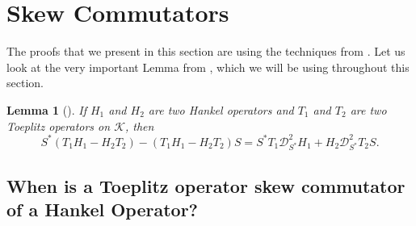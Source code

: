 \documentclass[12pt, reqno]{amsart}
\newtheorem{lemma}[theorem]{Lemma}
\theoremstyle{definition}
\theoremstyle{remark}
\numberwithin{equation}{section}
\newcommand{\ck}{\mathcal{K}}
\begin{document}
    \section{Skew Commutators}\label{section skew commutators}
    The proofs that we present in this section are using the techniques from \cite{CG}.
    Let us look at the very important Lemma from \cite{CG}, which we will be using throughout this section.
    \begin{lemma}[\cite{CG}]\label{LGU} 
        If $H_1$ and $H_2$ are two Hankel operators and $T_1$ and $T_2$ are two Toeplitz operators on $\ck$, then 
        \begin{equation*}
            S^*(T_1H_1-H_2T_2)-(T_1H_1-H_2T_2)S=S^*T_1\mathcal{D}^2_{S^*} H_1+H_2\mathcal{D}^2_{S^*} T_2S.
        \end{equation*}
    \end{lemma}
    \subsection{When is a Toeplitz operator skew commutator of a Hankel Operator?}
    
\end{document}
